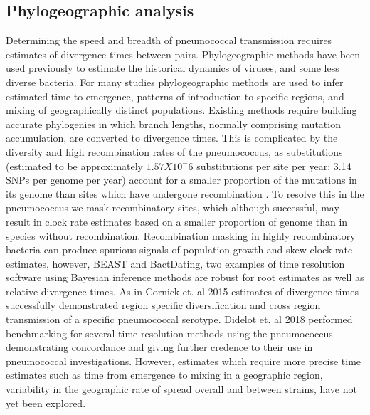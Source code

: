 \documentclass{article}
\begin{document}
\subsection{Phylogeographic analysis} 
Determining the speed and breadth of pneumococcal transmission requires estimates of divergence times between pairs. Phylogeographic methods have been used previously to estimate the historical dynamics of viruses, and some less diverse bacteria. For many studies phylogeographic methods are used to infer estimated time to emergence, patterns of introduction to specific regions, and mixing of geographically distinct populations\cite{wangGenomicEpidemiologyVibrio2020a,weillGenomicHistorySeventh2017,chihotaGeospatialDistributionMycobacterium2018,bartGlobalPopulationStructure2014,comasOutofAfricaMigrationNeolithic2013,allicockPhylogeographyPopulationDynamics2012,okoroIntracontinentalSpreadHuman2012,mutrejaEvidenceSeveralWaves2011,lemeyBayesianPhylogeographyFinds2009a}. Existing methods require building accurate phylogenies in which branch lengths, normally comprising mutation accumulation, are converted to divergence times. This is complicated by the diversity and high recombination rates of the pneumococcus, as substitutions (estimated to be approximately $1.57X10^-6$ substitutions per site per year; 3.14 SNPs per genome per year) account for a smaller proportion of the mutations in its genome than sites which have undergone recombination \cite{croucherRapidPneumococcalEvolution2011}. To resolve this in the pneumococcus we mask recombinatory sites, which although successful, may result in clock rate estimates based on a smaller proportion of genome than in species without recombination. Recombination masking in highly recombinatory bacteria can produce spurious signals of population growth and skew clock rate estimates, however, BEAST and BactDating, two examples of time resolution software using Bayesian inference methods are robust for root estimates as well as relative divergence times\cite{cornickRegionspecificDiversificationHighly2015,gladstoneInternationalGenomicDefinition2019b,croucherRapidPhylogeneticAnalysis2015,didelotBayesianInferenceAncestral2018,drummondBayesianEvolutionaryAnalysis2015,lapierreImpactSelectionGene2016}. As in Cornick et. al 2015 estimates of divergence times successfully demonstrated region specific diversification and cross region transmission of a specific pneumococcal serotype\cite{cornickRegionspecificDiversificationHighly2015}.
Didelot et. al 2018 performed benchmarking for several time resolution methods using the pneumococcus demonstrating concordance and giving further credence to their use in pneumococcal investigations\cite{didelotBayesianInferenceAncestral2018}. However, estimates which require more precise time estimates such as time from emergence to mixing in a geographic region, variability in the geographic rate of spread overall and between strains, have not yet been explored.  
\end{document}
